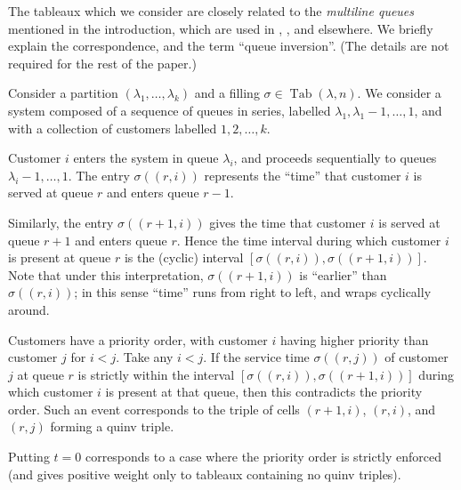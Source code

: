 \documentclass[ALCO,Unicode]{cedram}
\DeclareMathOperator{\PQT}{Tab}
\begin{document}
\begin{remark}\label{rem:terminology}
The tableaux which we consider are closely related to the
\emph{multiline queues} mentioned in the introduction, which are used in 
\cite{FM07}, \cite{martin-2020}, \cite{CMW18} and elsewhere. 
We briefly explain the correspondence, and the term ``queue inversion''.
(The details are not required for the rest of the paper.)

Consider a partition $(\lambda_1, \dots, \lambda_k)$ and a filling $\sigma\in\PQT(\lambda,n)$. 
We consider a system composed of a sequence of queues in series,
labelled $\lambda_1, \lambda_1-1, \dots, 1$, 
and with a collection of customers labelled $1,2,\dots, k$. 

Customer $i$ enters the system in queue $\lambda_i$, and 
proceeds sequentially to queues $\lambda_i-1, \dots, 1$. 
The entry $\sigma((r,i))$ represents the ``time'' that customer
$i$ is served at queue $r$ and enters queue $r-1$. 

Similarly, the entry $\sigma((r+1,i))$ gives the time that customer $i$
is served at queue $r+1$ and enters queue $r$. Hence
the time interval during which customer $i$ is present at 
queue $r$ is the (cyclic) interval $[\sigma((r,i)), \sigma((r+1,i))]$. 
Note that under this interpretation, $\sigma((r+1,i))$ is ``earlier''
than $\sigma((r,i))$; in this sense
``time'' runs from right to left, and wraps 
cyclically around.

Customers have a priority order, with customer $i$ having
higher priority than customer $j$ for $i<j$. Take any $i<j$. If the service time
$\sigma((r,j))$ of customer $j$ at queue $r$ is strictly within the
interval $[\sigma((r,i)), \sigma((r+1,i))]$ during which customer $i$ is present
at that queue, then this contradicts the priority order. 
Such an event corresponds to 
the triple of cells $(r+1,i)$, $(r,i)$, and $(r,j)$ forming a quinv triple. 

Putting $t=0$ corresponds to a case where the priority order is strictly enforced
(and gives positive weight only to tableaux containing no quinv triples). 
\end{remark}
\end{document}
